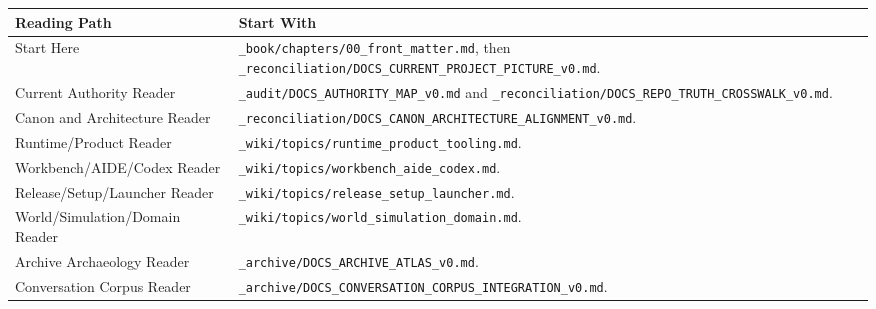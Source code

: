 \documentclass[10.5pt,a4paper,openany]{book}
\newcommand{\toprule}{\hline}
\newcommand{\midrule}{\hline}
\begin{document}
\begin{center}
{\small\renewcommand{\arraystretch}{1.18}
\begin{tabularx}{\linewidth}{@{}>{\raggedright\arraybackslash}X >{\raggedright\arraybackslash}X@{}}
\toprule
\textbf{Reading Path} & \textbf{Start With} \\
\midrule
Start Here & \texttt{\_\allowbreak{}book/\allowbreak{}chapters/\allowbreak{}00\_\allowbreak{}front\_\allowbreak{}matter.\allowbreak{}md}, then \texttt{\_\allowbreak{}reconciliation/\allowbreak{}DOCS\_\allowbreak{}CURRENT\_\allowbreak{}PROJECT\_\allowbreak{}PICTURE\_\allowbreak{}v0.\allowbreak{}md}.\allowbreak{} \\
Current Authority Reader & \texttt{\_\allowbreak{}audit/\allowbreak{}DOCS\_\allowbreak{}AUTHORITY\_\allowbreak{}MAP\_\allowbreak{}v0.\allowbreak{}md} and \texttt{\_\allowbreak{}reconciliation/\allowbreak{}DOCS\_\allowbreak{}REPO\_\allowbreak{}TRUTH\_\allowbreak{}CROSSWALK\_\allowbreak{}v0.\allowbreak{}md}.\allowbreak{} \\
Canon and Architecture Reader & \texttt{\_\allowbreak{}reconciliation/\allowbreak{}DOCS\_\allowbreak{}CANON\_\allowbreak{}ARCHITECTURE\_\allowbreak{}ALIGNMENT\_\allowbreak{}v0.\allowbreak{}md}.\allowbreak{} \\
Runtime/\allowbreak{}Product Reader & \texttt{\_\allowbreak{}wiki/\allowbreak{}topics/\allowbreak{}runtime\_\allowbreak{}product\_\allowbreak{}tooling.\allowbreak{}md}.\allowbreak{} \\
Workbench/\allowbreak{}AIDE/\allowbreak{}Codex Reader & \texttt{\_\allowbreak{}wiki/\allowbreak{}topics/\allowbreak{}workbench\_\allowbreak{}aide\_\allowbreak{}codex.\allowbreak{}md}.\allowbreak{} \\
Release/\allowbreak{}Setup/\allowbreak{}Launcher Reader & \texttt{\_\allowbreak{}wiki/\allowbreak{}topics/\allowbreak{}release\_\allowbreak{}setup\_\allowbreak{}launcher.\allowbreak{}md}.\allowbreak{} \\
World/\allowbreak{}Simulation/\allowbreak{}Domain Reader & \texttt{\_\allowbreak{}wiki/\allowbreak{}topics/\allowbreak{}world\_\allowbreak{}simulation\_\allowbreak{}domain.\allowbreak{}md}.\allowbreak{} \\
Archive Archaeology Reader & \texttt{\_\allowbreak{}archive/\allowbreak{}DOCS\_\allowbreak{}ARCHIVE\_\allowbreak{}ATLAS\_\allowbreak{}v0.\allowbreak{}md}.\allowbreak{} \\
Conversation Corpus Reader & \texttt{\_\allowbreak{}archive/\allowbreak{}DOCS\_\allowbreak{}CONVERSATION\_\allowbreak{}CORPUS\_\allowbreak{}INTEGRATION\_\allowbreak{}v0.\allowbreak{}md}.\allowbreak{} \\

\end{tabularx}}
\end{center}
\end{document}
